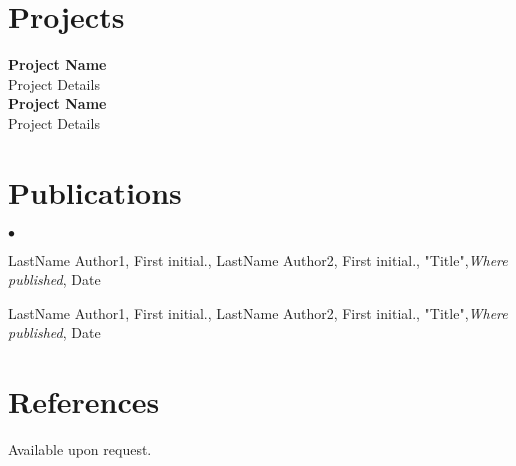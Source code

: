 \documentclass[margin,line]{res}
\newenvironment{list2}{
  \begin{list}{$\bullet$}{%
      \setlength{\itemsep}{0in}
      \setlength{\parsep}{0in} \setlength{\parskip}{0in}
      \setlength{\topsep}{0in} \setlength{\partopsep}{0in}
      \setlength{\leftmargin}{0.2in}}}{\end{list}}
\begin{document}
\begin{resume}
\section{\sc Projects}
{\bf Project Name}\\
Project Details\\

{\bf Project Name}\\
Project Details\\

\section{\sc Publications}

\begin{list2}
\item LastName Author1, First initial., LastName Author2, First initial.,  "Title",{\em Where published}, Date
\item LastName Author1, First initial., LastName Author2, First initial.,  "Title",{\em Where published}, Date
\end{list2}


\section{\sc References }
Available upon request.

\end{resume}
\end{document}
